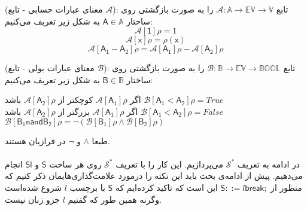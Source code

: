 \begin{defn}
(معنای عبارات حسابی - تابع $\mathcal{A}$): تابع 
$\mathcal{A}:\mathbb{A}\rightarrow \mathbb{EV} \rightarrow \mathbb{V}$
را به صورت بازگشتی روی ساختار 
$\mathsf{A} \in \mathbb{A}$
به شکل زیر تعریف می‌کنیم:
$$\mathcal{A[\mathsf{1}]\rho = }1     $$
$$\mathcal{A[\mathsf{x}]\rho = } \rho(\mathsf{x})          $$
$$\mathcal{A[\mathsf{A_1-A_2}]\rho = }\mathcal{A[\mathsf{A_1}]\rho }- \mathcal{A[\mathsf{A_2}]\rho }       $$

\end{defn}

\begin{defn}
	(معنای عبارات بولی - تابع $\mathcal{B}$): تابع 
	$\mathcal{B}: \mathbb{B} \rightarrow \mathbb{EV} \rightarrow \mathbb{BOOL}$
	را به صورت بازگشتی روی ساختار 
	$\mathsf{B} \in \mathbb{B}$
	به شکل زیر تعریف می‌کنیم:

\begin{center}
	اگر $\mathcal{A[\mathsf{A_1}]\rho }$ کوچکتر از $\mathcal{A[\mathsf{A_2}]\rho }$ باشد
	$\mathcal{B[\mathsf{A_1<A_2}]\rho = } True   \hspace{2cm}  $\\
	اگر $\mathcal{A[\mathsf{A_1}]\rho }$ بزرگتر از $\mathcal{A[\mathsf{A_2}]\rho }$ باشد
	$\mathcal{B[\mathsf{A_1<A_2}]\rho = } False   \hspace{2cm}  $\\
	$ \mathcal{B[\mathsf{B_1 nand B_2}]\rho = } \neg(\mathcal{B[\mathsf{B_1}]\rho}   \wedge \mathcal{B[\mathsf{B_2}]\rho}) $
\end{center}
\end{defn}

طبعا $\wedge$ و $\neg$ در فرازبان هستند.\\\\
در ادامه به تعریف $\mathcal{S^*}$ می‌پردازیم. این کار را با تعریف $\mathcal{S^*}$ روی هر ساخت $\mathsf{S}$ و $\mathsf{Sl}$ انجام می‌دهیم.
پیش از ادامه‌ی بحث باید این نکته را در‌مورد علامت‌گذاری‌هایمان ذکر کنیم که منظور از $        \mathsf{S} ::= l \mathsf{break;}  $ این است که تاکید کرده‌ایم که $\mathsf{S}$ با برچسب $l$ شروع شده‌است وگرنه همین طور که گفتیم   $l$ جزو زبان نیست.\\\\

